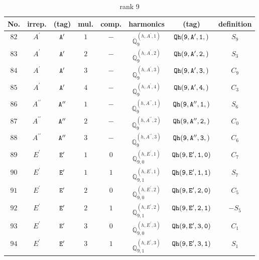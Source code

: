 \documentclass[fleqn,8pt]{jsarticle}
\begin{document}
\begin{table}[ht!]
\begin{center}
\caption{rank 9}
\renewcommand{\arraystretch}{1.3}
\begin{tabular}{cccccccc} \hline \hline
No. & irrep. & (tag) & mul. & comp. & harmonics & (tag) & definition \\ \hline
$ 82 $ & $ A^{\prime} $ & $ {\tt A'} $ & $ 1 $ & $ - $ & $ \mathbb{Q}_{9}^{(h,A^{\prime},1)} $ & $ {\tt Qh(9,A',1,)} $ & $ S_{9} $ \\
$ 83 $ & $ A^{\prime} $ & $ {\tt A'} $ & $ 2 $ & $ - $ & $ \mathbb{Q}_{9}^{(h,A^{\prime},2)} $ & $ {\tt Qh(9,A',2,)} $ & $ S_{3} $ \\
$ 84 $ & $ A^{\prime} $ & $ {\tt A'} $ & $ 3 $ & $ - $ & $ \mathbb{Q}_{9}^{(h,A^{\prime},3)} $ & $ {\tt Qh(9,A',3,)} $ & $ C_{9} $ \\
$ 85 $ & $ A^{\prime} $ & $ {\tt A'} $ & $ 4 $ & $ - $ & $ \mathbb{Q}_{9}^{(h,A^{\prime},4)} $ & $ {\tt Qh(9,A',4,)} $ & $ C_{3} $ \\
$ 86 $ & $ A^{\prime\prime} $ & $ {\tt A''} $ & $ 1 $ & $ - $ & $ \mathbb{Q}_{9}^{(h,A^{\prime\prime},1)} $ & $ {\tt Qh(9,A'',1,)} $ & $ S_{6} $ \\
$ 87 $ & $ A^{\prime\prime} $ & $ {\tt A''} $ & $ 2 $ & $ - $ & $ \mathbb{Q}_{9}^{(h,A^{\prime\prime},2)} $ & $ {\tt Qh(9,A'',2,)} $ & $ C_{0} $ \\
$ 88 $ & $ A^{\prime\prime} $ & $ {\tt A''} $ & $ 3 $ & $ - $ & $ \mathbb{Q}_{9}^{(h,A^{\prime\prime},3)} $ & $ {\tt Qh(9,A'',3,)} $ & $ C_{6} $ \\
$ 89 $ & $ E^{\prime} $ & $ {\tt E'} $ & $ 1 $ & $ 0 $ & $ \mathbb{Q}_{9,0}^{(h,E^{\prime},1)} $ & $ {\tt Qh(9,E',1,0)} $ & $ C_{7} $ \\
$ 90 $ & $ E^{\prime} $ & $ {\tt E'} $ & $ 1 $ & $ 1 $ & $ \mathbb{Q}_{9,1}^{(h,E^{\prime},1)} $ & $ {\tt Qh(9,E',1,1)} $ & $ S_{7} $ \\
$ 91 $ & $ E^{\prime} $ & $ {\tt E'} $ & $ 2 $ & $ 0 $ & $ \mathbb{Q}_{9,0}^{(h,E^{\prime},2)} $ & $ {\tt Qh(9,E',2,0)} $ & $ C_{5} $ \\
$ 92 $ & $ E^{\prime} $ & $ {\tt E'} $ & $ 2 $ & $ 1 $ & $ \mathbb{Q}_{9,1}^{(h,E^{\prime},2)} $ & $ {\tt Qh(9,E',2,1)} $ & $ - S_{5} $ \\
$ 93 $ & $ E^{\prime} $ & $ {\tt E'} $ & $ 3 $ & $ 0 $ & $ \mathbb{Q}_{9,0}^{(h,E^{\prime},3)} $ & $ {\tt Qh(9,E',3,0)} $ & $ C_{1} $ \\
$ 94 $ & $ E^{\prime} $ & $ {\tt E'} $ & $ 3 $ & $ 1 $ & $ \mathbb{Q}_{9,1}^{(h,E^{\prime},3)} $ & $ {\tt Qh(9,E',3,1)} $ & $ S_{1} $ \\

\end{tabular}
\end{center}
\end{table}
\end{document}
